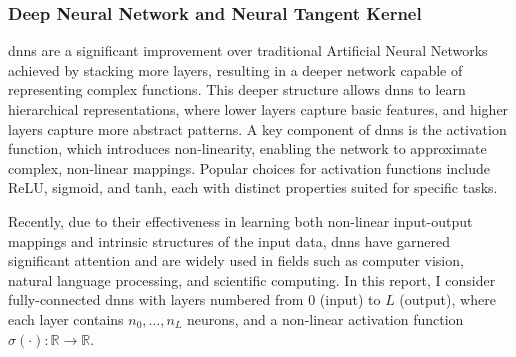 
\subsubsection{Deep Neural Network and Neural Tangent Kernel}
\label{section:NTK}

\acfp{dnn} are a significant improvement over traditional Artificial Neural Networks achieved by stacking more layers, resulting in a deeper network capable of representing complex functions. This deeper structure allows \acp{dnn} to learn hierarchical representations, where lower layers capture basic features, and higher layers capture more abstract patterns. A key component of \acp{dnn} is the activation function, which introduces non-linearity, enabling the network to approximate complex, non-linear mappings. Popular choices for activation functions include ReLU, sigmoid, and tanh, each with distinct properties suited for specific tasks.

Recently, due to their effectiveness in learning both non-linear input-output mappings and intrinsic structures of the input data, \acp{dnn} have garnered significant attention and are widely used in fields such as computer vision, natural language processing, and scientific computing. In this report, I consider fully-connected \acp{dnn} with layers numbered from \(0\) (input) to \(L\) (output), where each layer contains \(n_0, \ldots, n_L\) neurons, and a non-linear activation function \( \sigma (\cdot) : \mathbb{R} \to \mathbb{R} \). 

